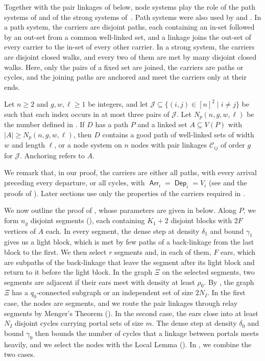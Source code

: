\documentclass[fontsize=12pt,leading=14pt]{fullpaper}
\DeclareMathOperator{\Arr}{\mathsf{Arr}}
\DeclareMathOperator{\Dep}{\mathsf{Dep}}
\newcommand{\Ccal}{\mathcal{C}}
\newcommand{\Jcal}{\mathcal{J}}
\newcounter{step}
\begin{document}
Together with the pair linkages of  below, node systems play the role of the path systems of \textcite[Definition~4.5]{KawarabayashiK15} and of the strong systems of~\cite[Definition~5.1]{CLNS26}.
Path systems were also used by \textcite{MPRS22} and \textcite{HKMM26a}.
In a path system, the carriers are disjoint paths, each containing an in-set followed by an out-set from a common well-linked set, and a linkage joins the out-set of every carrier to the in-set of every other carrier.
In a strong system, the carriers are disjoint closed walks, and every two of them are met by many disjoint closed walks.
Here, only the pairs of a fixed set are joined, the carriers are paths or cycles, and the joining paths are anchored and meet the carriers only at their ends.

\begin{theorem}[Preparation]\label{thm:pair-preparation}
  Let $n\ge2$ and $g,w,\ell\ge1$ be integers, and let $\Jcal\subseteq\{(i,j)\in[n]^2\mid i\ne j\}$ be such that each index occurs in at most three pairs of $\Jcal$.
  Let $N_p(n,g,w,\ell)$ be the number defined in .
  If $D$ has a path $P$ and a linked set $A\subseteq V(P)$ with $|A|\ge N_p(n,g,w,\ell)$, then $D$ contains a good path of well-linked sets of width $w$ and length $\ell$, or a node system on $n$ nodes with pair linkages $\Ccal_{ij}$ of order $g$ for $\Jcal$.
  Anchoring refers to $A$.
\end{theorem}

We remark that, in our proof, the carriers are either all paths, with every arrival preceding every departure, or all cycles, with $\Arr_i=\Dep_i=V_i$ (see  and the proofs of ).
Later sections use only the properties of the carriers required in .

We now outline the proof of , whose parameters are given in  below.
Along $P$, we form $n_g$ disjoint segments (), each containing $K_1+2$ disjoint blocks with $2F$ vertices of $A$ each.
In every segment, the dense step at density $\delta_1$ and bound $\gamma_1$ gives us a light block, which is met by few paths of a back-linkage from the last block to the first.
We then select $r$ segments and, in each of them, $F$ ears, which are subpaths of the back-linkage that leave the segment after its light block and return to it before the light block.
In the graph $\Xi$ on the selected segments, two segments are adjacent if their ears meet with density at least $\rho_0$.
By , the graph $\Xi$ has a $q_0$-connected subgraph or an independent set of size $2N_I$.
In the first case, the nodes are segments, and we route the pair linkages through relay segments by Menger's Theorem ().
In the second case, the ears close into at least $N_I$ disjoint cycles carrying portal sets of size $m$.
The dense step at density $\delta_0$ and bound $\gamma_0$ then bounds the number of cycles that a linkage between portals meets heavily, and we select the nodes with the Local Lemma ().
In , we combine the two cases.
\end{document}
